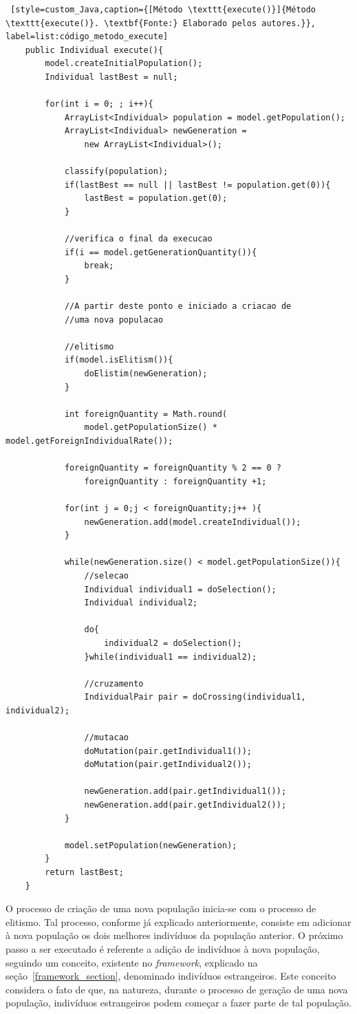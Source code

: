 \begin{lstlisting} [style=custom_Java,caption={[Método \texttt{execute()}]{Método \texttt{execute()}. \textbf{Fonte:} Elaborado pelos autores.}}, label=list:código_metodo_execute] 
	public Individual execute(){
		model.createInitialPopulation();
		Individual lastBest = null;
		
		for(int i = 0; ; i++){
			ArrayList<Individual> population = model.getPopulation();
			ArrayList<Individual> newGeneration = 
				new ArrayList<Individual>();
			
			classify(population);
			if(lastBest == null || lastBest != population.get(0)){
				lastBest = population.get(0);
			}
			
			//verifica o final da execucao
			if(i == model.getGenerationQuantity()){
				break;
			}
			
			//A partir deste ponto e iniciado a criacao de 
			//uma nova populacao
			
			//elitismo
			if(model.isElitism()){
				doElistim(newGeneration);
			}
			
			int foreignQuantity = Math.round(
				model.getPopulationSize() * model.getForeignIndividualRate());
			
			foreignQuantity = foreignQuantity % 2 == 0 ? 
				foreignQuantity : foreignQuantity +1;
			
			for(int j = 0;j < foreignQuantity;j++ ){
				newGeneration.add(model.createIndividual());
			}
			
			while(newGeneration.size() < model.getPopulationSize()){
				//selecao
				Individual individual1 = doSelection();
				Individual individual2;
				
				do{
					individual2 = doSelection();
				}while(individual1 == individual2);
				
				//cruzamento
				IndividualPair pair = doCrossing(individual1, individual2);
				
				//mutacao
				doMutation(pair.getIndividual1());
				doMutation(pair.getIndividual2());
				
				newGeneration.add(pair.getIndividual1());
				newGeneration.add(pair.getIndividual2());
			}
			
			model.setPopulation(newGeneration);
		}
		return lastBest;
	}

\end{lstlisting}

\par O processo de criação de uma nova população inicia-se com o processo de elitismo. Tal processo, conforme já explicado
anteriormente, consiste em adicionar à nova população os dois melhores indivíduos da população anterior. O próximo
passo a ser executado é referente a adição de indivíduos à nova população, seguindo um conceito, existente no \textit{framework}, explicado 
na seção~\ref{framework_section}, denominado indivíduos estrangeiros. Este conceito considera o fato de que, na natureza, durante o processo de geração de uma nova população, indivíduos estrangeiros podem começar a fazer parte de tal população. 

